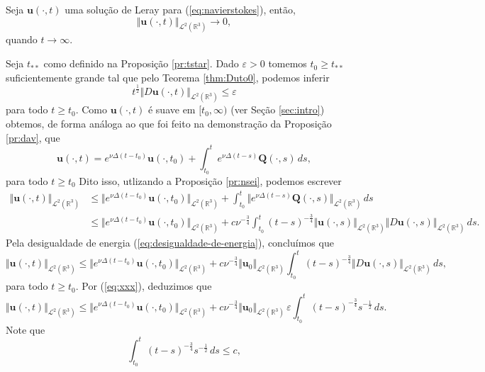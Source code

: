 \documentclass[a4paper, 11pt]{book}
\theoremstyle{definition}
\newcommand{\bR}{\mathbb{R}}
\newcommand{\bu}{\mathbf{u}}
\newcommand{\BQ}{\mathbf{Q}}
\newcommand{\cL}{\mathcal{L}}
\begin{document}
\begin{tbox} \label{thm:problema-leray}
    Seja $\bu(\cdot,t)$ uma solução de Leray para (\ref{eq:navierstokes}), então,
    \[
        \Vert \bu(\cdot,t) \Vert_{\cL^2(\bR^3)}\to 0,
    \]
    quando $t \to \infty$.
\end{tbox}
\begin{prf}
    Seja $t_{**}$ como definido na Proposição \ref{pr:tstar}.
    Dado $\varepsilon > 0$ tomemos $t_0 \geqslant t_{**}$ suficientemente grande tal que pelo Teorema \ref{thm:Duto0}, podemos inferir
    \begin{equation} \label{eq:xxx}
        t^{\frac{1}{2}} \Vert D\bu(\cdot,t) \Vert_{\cL^2(\bR^3)} \leqslant \varepsilon
    \end{equation}
    para todo $t \geqslant t_0$.
    Como $\bu(\cdot,t)$ é suave em $[t_0,\infty)$ (ver Seção \ref{sec:intro}) obtemos, de forma análoga ao que foi feito na demonstração da Proposição \ref{pr:dav}, que
    \[
        \bu(\cdot,t) = e^{\nu\Delta(t - t_0)} \bu(\cdot,t_0) + \int_{t_0}^{t} e^{\nu\Delta(t-s)}\BQ(\cdot,s) \, ds,
    \]
    para todo $t \geqslant t_0$
    Dito isso, utlizando a Proposição \ref{pr:nsei}, podemos escrever
    \[
        \begin{aligned}
            \Vert \bu(\cdot,t) \Vert_{\cL^2(\bR^3)} &\leqslant \Vert e^{\nu\Delta(t - t_0)} \bu(\cdot,t_0) \Vert_{\cL^2(\bR^3)} + \int_{t_0}^t \Vert e^{\nu\Delta(t-s)} \BQ(\cdot,s) \Vert_{\cL^2(\bR^3)}\,ds\\
            &\leqslant \Vert e^{\nu\Delta(t - t_0)} \bu(\cdot,t_0) \Vert_{\cL^2(\bR^3)} + c \nu^{-\frac{3}{4}} \int_{t_0}^t (t - s)^{-\frac{3}{4}} \Vert \bu(\cdot,s) \Vert_{\cL^2(\bR^3)} \Vert D\bu(\cdot,s) \Vert_{\cL^2(\bR^3)} \,ds.
        \end{aligned}
    \]
    Pela desigualdade de energia (\ref{eq:desigualdade-de-energia}), concluímos que
    \[
        \Vert \bu(\cdot,t) \Vert_{\cL^2(\bR^3)} \leqslant\Vert e^{\nu\Delta(t - t_0)} \bu(\cdot,t_0) \Vert_{\cL^2(\bR^3)} + c \nu^{-\frac{3}{4}} \Vert \bu_0 \Vert_{\cL^2(\bR^3)} \int_{t_0}^t (t - s)^{-\frac{3}{4}}\Vert D\bu(\cdot,s) \Vert_{\cL^2(\bR^3)} \,ds,
    \]
    para todo $t \geqslant t_0$.
    Por (\ref{eq:xxx}), deduzimos que
    \[
        \Vert \bu(\cdot,t) \Vert_{\cL^2(\bR^3)} \leqslant \Vert e^{\nu\Delta(t - t_0)} \bu(\cdot,t_0) \Vert_{\cL^2(\bR^3)} + c \nu^{-\frac{3}{4}} \Vert \bu_0 \Vert_{\cL^2(\bR^3)}\, \varepsilon \! \int_{t_0}^t (t - s)^{-\frac{3}{4}} s^{-\frac{1}{2}} \,ds.
    \]
    Note que
    \[
        \int_{t_0}^t (t - s)^{-\frac{3}{4}}s^{-\frac{1}{2}}\,ds \leqslant c,
\]
\end{prf}
\end{document}
